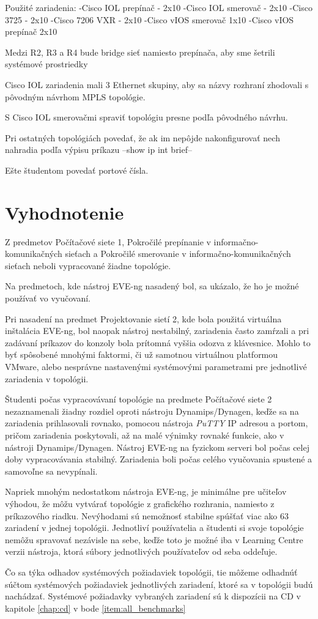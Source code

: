 Použité zariadenia:
-Cisco IOL prepínač - 2x10
-Cisco IOL smerovač - 2x10
-Cisco 3725 - 2x10
-Cisco 7206 VXR - 2x10
-Cisco vIOS smerovač 1x10
-Cisco vIOS prepínač 2x10

Medzi R2, R3 a R4 bude bridge sieť namiesto prepínača, aby sme šetrili systémové prostriedky

Cisco IOL zariadenia mali 3 Ethernet skupiny, aby sa názvy rozhraní zhodovali s pôvodným návrhom MPLS topológie.

S Cisco IOL smerovačmi spraviť topológiu presne podľa pôvodného návrhu.

Pri ostatných topológiách povedať, že ak im nepôjde nakonfigurovať nech nahradia podľa výpisu príkazu --show ip int brief--

Ešte študentom povedať portové čísla.





\section{Vyhodnotenie}

Z predmetov Počítačové siete 1, Pokročilé prepínanie v informačno-komunikačných sieťach a Pokročilé smerovanie v informačno-komunikačných sieťach neboli vypracované žiadne topológie.

Na predmetoch, kde nástroj EVE-ng nasadený bol, sa ukázalo, že ho je možné používať vo vyučovaní.

Pri nasadení na predmet Projektovanie sietí 2, kde bola použitá virtuálna inštalácia EVE-ng, bol naopak nástroj nestabilný, zariadenia často zamŕzali a pri zadávaní príkazov do konzoly bola prítomná vyššia odozva z klávesnice. Mohlo to byť spôsobené mnohými faktormi, či už samotnou virtuálnou platformou VMware, alebo nesprávne nastavenými systémovými parametrami pre jednotlivé zariadenia v topológii.

Študenti počas vypracovávaní topológie na predmete Počítačové siete 2 nezaznamenali žiadny rozdiel oproti nástroju Dynamips/Dynagen, keďže sa na zariadenia prihlasovali rovnako, pomocou nástroja \emph{PuTTY} IP adresou a portom, pričom zariadenia poskytovali, až na malé výnimky rovnaké funkcie, ako v nástroji Dynamips/Dynagen. Nástroj EVE-ng na fyzickom serveri bol počas celej doby vypracovávania stabilný. Zariadenia boli počas celého vyučovania spustené a samovoľne sa nevypínali.

Napriek mnohým nedostatkom nástroja EVE-ng, je minimálne pre učiteľov výhodou, že môžu vytvárať topológie z grafického rozhrania, namiesto z príkazového riadku. Nevýhodami sú nemožnosť stabilne spúšťať viac ako 63 zariadení v jednej topológii. Jednotliví používatelia a študenti si svoje topológie nemôžu spravovať nezávisle na sebe, keďže toto je možné iba v Learning Centre verzii nástroja, ktorá súbory jednotlivých používateľov od seba oddeľuje.

Čo sa týka odhadov systémových požiadaviek topológii, tie môžeme odhadnúť súčtom systémových požiadaviek jednotlivých zariadení, ktoré sa v topológii budú nachádzať. Systémové požiadavky vybraných zariadení sú k dispozícii na CD v kapitole \ref{chap:cd} v bode \ref{item:all_benchmarks}